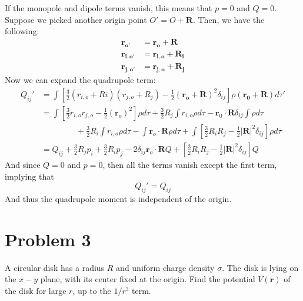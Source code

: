 \documentclass[10pt]{article}
\begin{document}
	\begin{solution}
		If the monopole and dipole terms vanish, this means that $p = 0$ and $Q = 0$. Suppose we picked another
		origin point $O' = O + \mathbf R$. Then, we have the following: 
		\begin{align*}
			\mathbf{r_{o'}} &= \mathbf{r_o} + \mathbf R\\
			\mathbf{r_{i, o'}} &= \mathbf{r_{i, o}} + \mathbf{R_i} \\
			\mathbf{r_{j, o'}} &= \mathbf{r_{j, o}} + \mathbf{R_j} 
		\end{align*}
		Now we can expand the quadrupole term:
		\begin{align*}
			Q_{ij}' &= \int \left[ \frac{3}{2}(r_{i, o} + Ri)(r_{j, o} + R_j) - \frac{1}{2}(\mathbf{r_o} 
				+\mathbf R)^2
			\delta_{ij}\right]\rho(\mathbf{r_0} + \mathbf R) d\tau'\\
					&= \int \left[\frac{3}{2}r_{i, o}r_{j, o} - \frac{1}{2}(\mathbf r_o)^2\right]\rho d\tau
				+ \frac{3}{2} R_j \int r_{i, o} \rho d\tau - \mathbf r_0 \cdot \mathbf R \delta_{ij} \int 
				\rho d\tau \\&\phantom{aaaaaaaa} + \frac{3}{2}R_i \int r_{i, o} \rho d\tau -
				\int \mathbf r_o \cdot \mathbf R \rho
					d\tau + \int \left[\frac{3}{2}R_i R_j  -
					\frac{1}{2}|\mathbf R|^2 \delta_{ij} \right]\rho d\tau\\
							 &= Q_{ij} + \frac{3}{2}R_j p_i + \frac{3}{2}R_ip_j - 2\delta_{ij}\mathbf r_o \cdot 
							 \mathbf R Q + \left[\frac{3}{2}R_i R_j - \frac{1}{2}|\mathbf R|^2\delta_{ij}\right]
							 Q
		\end{align*}
		And since $Q = 0$ and $p = 0$, then all the terms vanish except the first term, implying that 
		\[
			Q_{ij}' = Q_{ij}
		\] 
		And thus the quadrupole moment is independent of the origin. 
	\end{solution}

	\pagebreak
	\section*{Problem 3}
	A circular disk has a radius $R$ and uniform charge density $\sigma$. The disk is lying on the $x-y$ plane, 
	with its center fixed at the origin. Find the potential $V(\mathbf r)$ of the disk for large $r$, up to 
	the $1/r^3$ term. 
\end{document}
